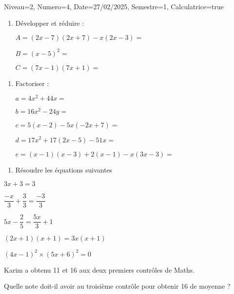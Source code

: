 \documentclass[a4paper,12pt]{article}
\begin{document}
\begin{Maquette}[DS]{Niveau=2, Numero=4, Date=27/02/2025, Semestre=1, Calculatrice=true}

\begin{exercice}
\begin{enumerate}
\item{} Développer et réduire :

$
A=\left(2x-7\right)\left(2x+7\right)-x\left(2x-3\right)=$\anserline[2]

$
B=\left(x-5\right)^{2}=$
\anserline[1]

$C=\left(7x-1\right)\left(7x+1\right)=$\anserline[1]

\end{enumerate}
\end{exercice}

\begin{exercice}
\begin{enumerate}
\item{} Factoriser :

$a=4x^{2}+44x=$\anserline[1]

$b=16x^{2}-24y=$\anserline[1]

$c=5\left(x-2\right)-5x\left(-2x+7\right)=$\anserline[1]

$d=17x^{2}+17\left(2x-5\right)-51x=$\anserline[1]

$e=\left(x-1\right)\left(x-3\right)+2\left(x-1\right)-x\left(3x-3\right)=$\anserline[2]

\end{enumerate}
\end{exercice}

\begin{exercice}
\begin{enumerate}
\item{} Résoudre les équations suivantes 
\end{enumerate}
\begin{multicols}{3}
\(3x+3=3\)\newline
\anserline[8]
\columnbreak

\(\dfrac{-x}{3}+\dfrac{3}{3}=\dfrac{-3}{3}\)\newline
\anserline[8]
\columnbreak

\(5x-\dfrac{2}{5}=\dfrac{5x}{3}+1\)\newline
\anserline[8]
\end{multicols}

\begin{multicols}{2}
\((2x+1)(x+1)=3x(x+1)\)\newline
\anserline[12]
\columnbreak

\(\left(4x-1\right)^{2}\times(5x+6)^{2}=0\)\newline
\anserline[12]
\end{multicols}
\end{exercice}

\begin{exercice}
Karim a obtenu 11 et 16 aux deux premiers contrôles de Maths.

Quelle note doit-il avoir au troisième contrôle pour obtenir 16 de moyenne ?
\newline
\anserline[17]
\end{exercice}
\end{Maquette}
\end{document}
